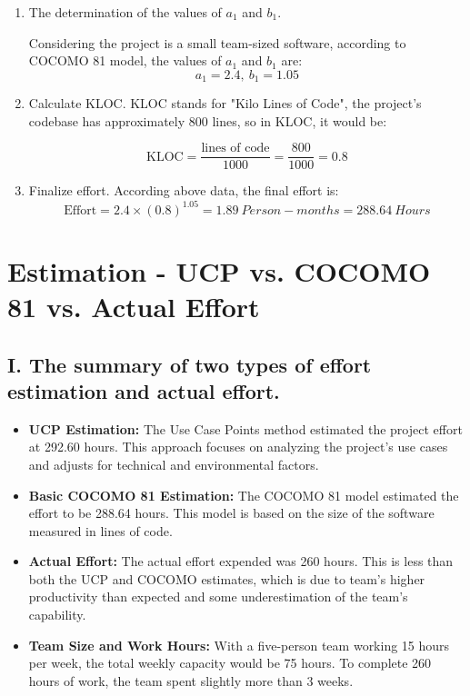 \documentclass[english,12pt,a4paper]{report}
\begin{document}
	\begin{enumerate}[label=\Roman*., align=left, leftmargin=*]
		\item The determination of the values of $a_1$ and $b_1$.
		
		Considering the project is a small team-sized software, according to COCOMO 81 model, the values of $a_1$ and $b_1$ are:
		\begin{equation}
			a_1 = 2.4, \ b_1 = 1.05
		\end{equation}
		
		\item Calculate KLOC.
		KLOC stands for "Kilo Lines of Code", the project's codebase has approximately 800 lines, so in KLOC, it would be:
		
		\begin{equation}
			\text{KLOC} = \frac{\text{lines of code}}{1000} = \frac{800}{1000} = 0.8
		\end{equation}
		
		
		\item Finalize effort.
		According above data, the final effort is:
		\begin{equation}
				\text{Effort} = 2.4 \times (0.8)^{1.05} = 1.89\ Person-months = 288.64\ Hours
		\end{equation}
		
	\end{enumerate}
	

	
	\section{Estimation - UCP vs. COCOMO 81 vs. Actual Effort }
		\subsection*{I. The summary of two types of effort estimation and actual effort.}
			
			\begin{itemize}[leftmargin=*]
				\item \textbf{UCP Estimation:} The Use Case Points method estimated the project effort at 292.60 hours. This approach focuses on analyzing the project's use cases and adjusts for technical and environmental factors.
				
				\item \textbf{Basic COCOMO 81 Estimation:} The COCOMO 81 model estimated the effort to be 288.64 hours. This model is based on the size of the software measured in lines of code.
				
				\item \textbf{Actual Effort:} The actual effort expended was 260 hours. This is less than both the UCP and COCOMO estimates, which is due to team's higher productivity than expected and some underestimation of the team's capability.
				
				\item \textbf{Team Size and Work Hours:} With a five-person team working 15 hours per week, the total weekly capacity would be 75 hours. To complete 260 hours of work, the team spent slightly more than 3 weeks.
			\end{itemize}
		
\end{document}
